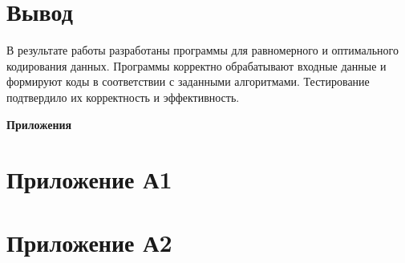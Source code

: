 \documentclass[oneside,a4paper,14pt]{extarticle}
\begin{document}
\newpage
\section*{Вывод}
В результате работы разработаны программы для равномерного и оптимального
кодирования данных. Программы корректно обрабатывают входные данные и формируют
коды в соответствии с заданными алгоритмами. Тестирование подтвердило их
корректность и эффективность.\\
\newpage
\begin{flushright}
    \textcolor{black!30}{\textbf{Приложения}}
\end{flushright}
\section*{Приложение А1}
\newpage
\section*{Приложение А2}
\end{document}
